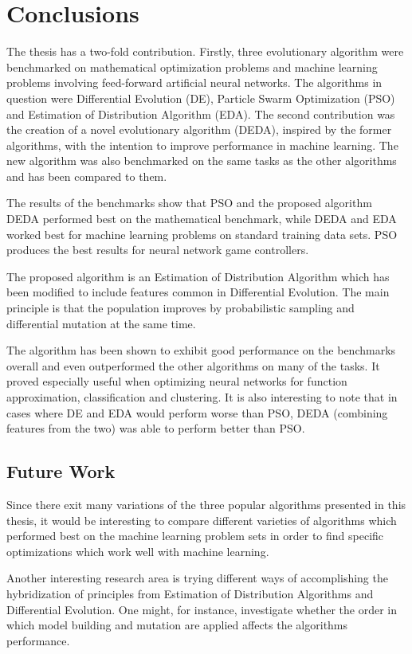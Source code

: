 \section{Conclusions}

The thesis has a two-fold contribution. Firstly, three evolutionary algorithm were benchmarked on mathematical optimization problems and machine learning problems involving feed-forward artificial neural networks. The algorithms in question were Differential Evolution (DE), Particle Swarm Optimization (PSO) and Estimation of Distribution Algorithm (EDA). The second contribution was the creation of a novel evolutionary algorithm (DEDA), inspired by the former algorithms, with the intention to improve performance in machine learning. The new algorithm was also benchmarked on the same tasks as the other algorithms and has been compared to them.

The results of the benchmarks show that PSO and the proposed algorithm DEDA performed best on the mathematical benchmark, while DEDA and EDA worked best for machine learning problems on standard training data sets. PSO produces the best results for neural network game controllers.

The proposed algorithm is an Estimation of Distribution Algorithm which has been modified to include features common in Differential Evolution. The main principle is that the population improves by probabilistic sampling and differential mutation at the same time.

The algorithm has been shown to exhibit good performance on the benchmarks overall and even outperformed the other algorithms on many of the tasks. It proved especially useful when optimizing neural networks for function approximation, classification and clustering. It is also interesting to note that in cases where DE and EDA would perform worse than PSO, DEDA (combining features from the two) was able to perform better than PSO.

\subsection{Future Work}

Since there exit many variations of the three popular algorithms presented in this thesis, it would be interesting to compare different varieties of algorithms which performed best on the machine learning problem sets in order to find specific optimizations which work well with machine learning.

Another interesting research area is trying different ways of accomplishing the hybridization of principles from Estimation of Distribution Algorithms and Differential Evolution. One might, for instance, investigate whether the order in which model building and mutation are applied affects the algorithms performance.
